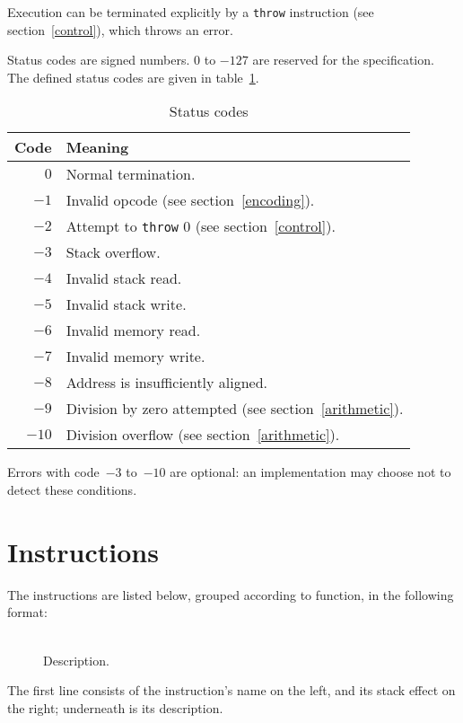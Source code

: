 \documentclass[a4paper]{article}
\newcommand{\spic}[1]{\texttt{\slshape{#1\/}}}
\newlength{\itemwidth}\itemwidth=\textwidth \advance\itemwidth by -0.1in
\newlength{\instname}\instname=0.8in
\newlength{\stackcom}\stackcom=3.7in
\newcommand{\instprim}[3]{\item[]\parbox{\itemwidth}%
{\makebox[\instname][l]{\tt #1}%
\makebox[\stackcom][r]{\spic{\pbox[t]{\stackcom}{#2}}}\\[0.5ex]#3}}
\newcommand{\inst}[4]{\instprim{#1}{…#2 → …#3}{#4}}
\begin{document}
Execution can be terminated explicitly by a {\tt throw} instruction (see section~\ref{control}), which throws an error.

Status codes are signed numbers. $0$ to $-127$ are reserved for the specification. The defined status codes are given in table~\ref{statustable}.

\begin{table}[htb]
\begin{center}
\begin{tabular}{rp{4in}} \toprule
\bf Code & \bf Meaning \\ \midrule
$0$ & Normal termination. \\
$-1$ & Invalid opcode (see section~\ref{encoding}). \\
$-2$ & Attempt to {\tt throw} $0$ (see section~\ref{control}). \\
$-3$ & Stack overflow. \\
$-4$ & Invalid stack read. \\
$-5$ & Invalid stack write. \\
$-6$ & Invalid memory read. \\
$-7$ & Invalid memory write. \\
$-8$ & Address is insufficiently aligned. \\
$-9$ & Division by zero attempted (see section~\ref{arithmetic}). \\
$-10$ & Division overflow (see section~\ref{arithmetic}). \\
 \bottomrule
\end{tabular}
\caption{\label{statustable}Status codes}
\end{center}
\end{table}

\noindent Errors with code~$-3$ to~$-10$ are optional: an implementation may choose not to detect these conditions.


\section{Instructions}

The instructions are listed below, grouped according to function, in the following format:

\begin{description}
\inst{NAME}{before}{after}{Description.}
\end{description}

\noindent The first line consists of the instruction’s name on the left, and its stack effect on the right; underneath is its description.
\end{document}
